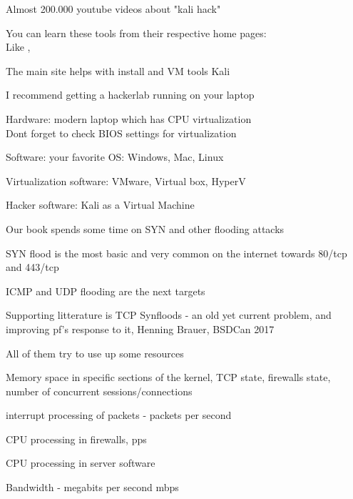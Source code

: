 \documentclass[Screen16to9,17pt]{foils}
\begin{document}
\begin{list1}
\item Almost 200.000 youtube videos about "kali hack"
\item You can learn these tools from their respective home pages:\\
Like , 
\item The main site helps with install and VM tools Kali 
\end{list1}



\begin{list2}
\item I recommend getting a hackerlab running on your laptop
\item Hardware: modern laptop which has CPU virtualization\\
Dont forget to check BIOS settings for virtualization
\item Software: your favorite OS: Windows, Mac, Linux
\item Virtualization software: VMware, Virtual box, HyperV
\item Hacker software: Kali as a Virtual Machine 
\end{list2}




\begin{list2}
\item Our book spends some time on SYN and other flooding attacks
\item SYN flood is the most basic and very common on the internet towards 80/tcp and 443/tcp
\item ICMP and UDP flooding are the next targets
\item Supporting litterature is TCP Synfloods - an old yet current problem, and improving pf's response to it, Henning Brauer, BSDCan 2017
\item All of them try to use up some resources
\begin{list2}
\item Memory space in specific sections of the kernel, TCP state, firewalls state, number of concurrent sessions/connections
\item interrupt processing of packets - packets per second
\item CPU processing in firewalls, pps
\item CPU processing in server software
\item Bandwidth - megabits per second mbps
\end{list2}
\end{list2}
\end{document}
